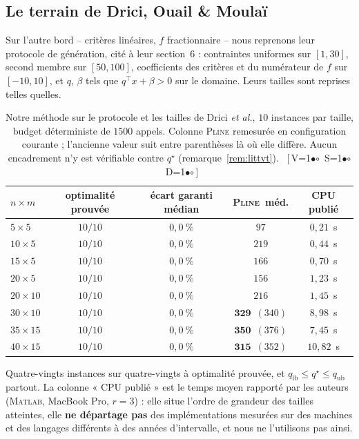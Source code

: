\documentclass[11pt,a4paper]{article}
\theoremstyle{plain}
\theoremstyle{remark}
\newcommand{\ILP}{\textsc{Pline}}
\newcommand{\qs}{q^{\star}}
\newcommand{\cfgm}[1]{\ifnum#1=1$\bullet$\else$\circ$\fi}
\newcommand{\conf}[3]{%
  \textsf{\footnotesize[\,V\cfgm{#1}\ S\cfgm{#2}\ D\cfgm{#3}\,]}}
\begin{document}
\subsection{Le terrain de Drici, Ouail \& Moulaï}
\label{sec:matchdrici}

Sur l'autre bord -- critères linéaires, $f$ fractionnaire -- nous reprenons
leur protocole de génération, cité à leur section~6 : contraintes uniformes
sur $[1,30]$, second membre sur $[50,100]$, coefficients des critères et du
numérateur de $f$ sur $[-10,10]$, et $q$, $\beta$ tels que
$q^{\top}x+\beta>0$ sur le domaine. Leurs tailles sont reprises telles
quelles.

\begin{table}[H]
\centering
\caption{Notre méthode sur le protocole et les tailles de Drici
\emph{et al.}, $10$ instances par taille, budget déterministe de $1500$
appels. Colonne \ILP{} remesurée en configuration courante ; l'ancienne
valeur suit entre parenthèses là où elle diffère. Aucun encadrement n'y est
vérifiable contre $\qs$ (remarque~\ref{rem:littvt}).\ \conf{1}{1}{1}}
\label{tab:drici}
\begin{tabular}{lcccc}
\toprule
$n\times m$ & optimalité prouvée & écart garanti médian & \ILP\ méd.
 & CPU publié\\
\midrule
$5\times 5$   & $10/10$ & $0{,}0\ \%$ & $97$  & $0{,}21$~s\\
$10\times 5$  & $10/10$ & $0{,}0\ \%$ & $219$ & $0{,}44$~s\\
$15\times 5$  & $10/10$ & $0{,}0\ \%$ & $166$ & $0{,}70$~s\\
$20\times 5$  & $10/10$ & $0{,}0\ \%$ & $156$ & $1{,}23$~s\\
$20\times 10$ & $10/10$ & $0{,}0\ \%$ & $216$ & $1{,}45$~s\\
$30\times 10$ & $10/10$ & $0{,}0\ \%$ & $\mathbf{329}$~{\tiny$(340)$} & $8{,}98$~s\\
$35\times 15$ & $10/10$ & $0{,}0\ \%$ & $\mathbf{350}$~{\tiny$(376)$} & $7{,}45$~s\\
$40\times 15$ & $10/10$ & $0{,}0\ \%$ & $\mathbf{315}$~{\tiny$(352)$} & $10{,}82$~s\\
\bottomrule
\end{tabular}
\end{table}

\noindent
Quatre-vingts instances sur quatre-vingts à optimalité prouvée, et
$q_{\text{lb}}\le\qs\le q_{\text{ub}}$ partout. La colonne « CPU publié »
est le temps moyen rapporté par les auteurs (\textsc{Matlab}, MacBook Pro,
$r=3$) : elle situe l'ordre de grandeur des tailles atteintes, elle
\textbf{ne départage pas} des implémentations mesurées sur des machines et
des langages différents à des années d'intervalle, et nous ne l'utilisons
pas ainsi.
\end{document}
